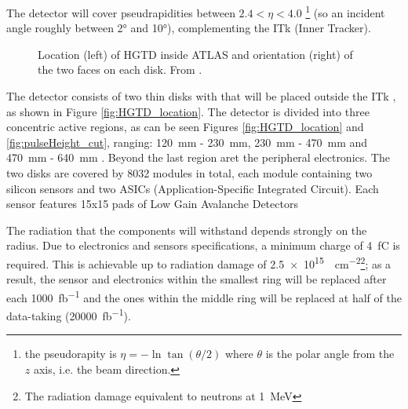 The detector will cover pseudrapidities between $2.4 < \eta < 4.0$ \footnote{the pseudorapity is $\eta=-\ln \tan(\theta/2)$ where $\theta$ is the polar angle from the $z$ axis, i.e. the beam direction.} (so an incident angle roughly between 2° and 10°), complementing the ITk (Inner Tracker).
\begin{figure}[!ht]
    \centering
    \hfill
    \centering
    \caption{Location (left) of HGTD inside ATLAS and orientation (right) of the two faces on each disk. From \cite{cernTechnicalDesign}.}
\end{figure}

The detector consists of two thin disks with that will be placed outside the ITk , as shown in Figure \ref{fig:HGTD_location}. The detector is divided into three concentric active regions, as can be seen Figures \ref{fig:HGTD_location} and \ref{fig:pulseHeight_cut}, ranging: \qty{120}{\milli\meter} - \qty{230}{\milli\meter}, \qty{230}{\milli\meter} - \qty{470}{\milli\meter} and  \qty{470}{\milli\meter} - \qty{640}{\milli\meter} \cite{CERN-LHCC-2020-007}. Beyond the last region aret the peripheral electronics. The two disks are covered by 8032 modules in total, each module containing two silicon sensors and two ASICs (Application-Specific Integrated Circuit). Each sensor features 15x15 pads of Low Gain Avalanche Detectors %

The radiation that the components will withstand depends strongly on the radius. Due to electronics and sensors specifications, a minimum charge of \qty{4}{\femto\coulomb} is required. This is achievable up to radiation damage of \qty{2.5e15}{\neutroneq\centi\meter^{-2}}\footnote{The radiation damage equivalent to neutrons at \qty{1}{\mega\electronvolt} }; as a result, the sensor and electronics within the smallest ring will be replaced after each \qty{1000}{\femto\barn^{-1}} and the ones within the middle ring will be replaced at half of the data-taking (\qty{20000}{\femto\barn^{-1}}).

